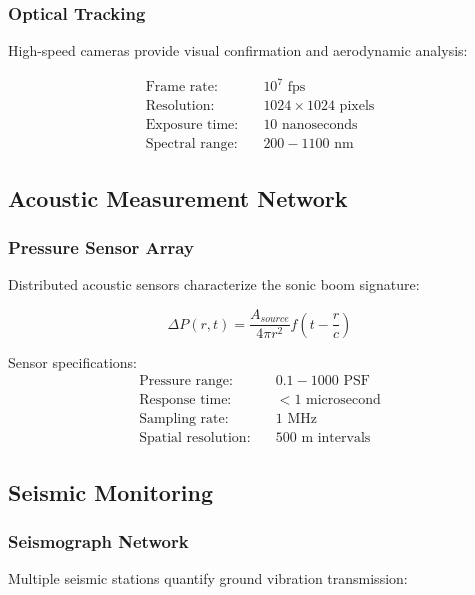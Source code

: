 \documentclass[12pt,a4paper]{article}
\begin{document}
\subsubsection{Optical Tracking}
High-speed cameras provide visual confirmation and aerodynamic analysis:

\begin{align}
\text{Frame rate:} &\quad 10^7 \text{ fps} \\
\text{Resolution:} &\quad 1024 \times 1024 \text{ pixels} \\
\text{Exposure time:} &\quad 10 \text{ nanoseconds} \\
\text{Spectral range:} &\quad 200-1100 \text{ nm}
\end{align}

\subsection{Acoustic Measurement Network}

\subsubsection{Pressure Sensor Array}
Distributed acoustic sensors characterize the sonic boom signature:

\begin{equation}
\Delta P(r,t) = \frac{A_{source}}{4\pi r^2} f\left(t - \frac{r}{c}\right)
\label{eq:pressure_propagation}
\end{equation}

Sensor specifications:
\begin{align}
\text{Pressure range:} &\quad 0.1-1000 \text{ PSF} \\
\text{Response time:} &\quad < 1 \text{ microsecond} \\
\text{Sampling rate:} &\quad 1 \text{ MHz} \\
\text{Spatial resolution:} &\quad 500 \text{ m intervals}
\end{align}

\subsection{Seismic Monitoring}

\subsubsection{Seismograph Network}
Multiple seismic stations quantify ground vibration transmission:
\end{document}
